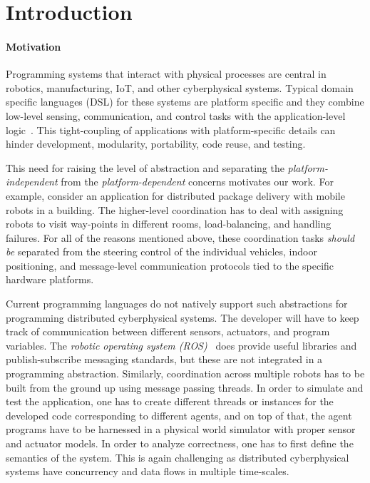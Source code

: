 \section{Introduction}
\label{sec:intro}

\paragraph{Motivation}
Programming systems that interact with physical processes are central in  robotics, manufacturing, IoT, and other cyberphysical systems. Typical domain specific languages (DSL) for these systems are platform specific and they combine  low-level sensing, communication, and control tasks with the application-level logic~\cite{nordmann2014robotics}. This  tight-coupling of applications with platform-specific details can hinder development, modularity, portability, code reuse, and testing. 

This need for raising the level of abstraction and separating the \emph{platform-independent} from the \emph{platform-dependent} concerns motivates our work. For example, consider an application for distributed package delivery with mobile robots in a building. The higher-level coordination has to deal with assigning robots to visit way-points in different rooms, load-balancing, and handling failures.  For all of the reasons mentioned above, these coordination tasks {\em should be\/} separated from the  steering control of the individual vehicles, indoor positioning, and message-level communication protocols tied to the specific hardware platforms. 

Current programming languages do not natively support such abstractions for programming distributed cyberphysical systems.  The developer will have to keep track of communication between different sensors, actuators, and program variables. The {\em robotic operating system (ROS)}~\cite{rosbridge_suite,ros} does provide useful libraries and  publish-subscribe messaging standards, but these are not integrated in a programming abstraction. Similarly, coordination across multiple robots has to be built from the ground up using message passing threads. In order to simulate and test the application, one has to create different threads or instances for the developed code corresponding to different agents, and on top of that, the agent programs have to be harnessed in a physical world simulator with proper sensor and actuator models. In order to analyze correctness, one has to first define the semantics of the system. This  is again challenging  as  distributed cyberphysical systems have concurrency and data flows in multiple time-scales. 


